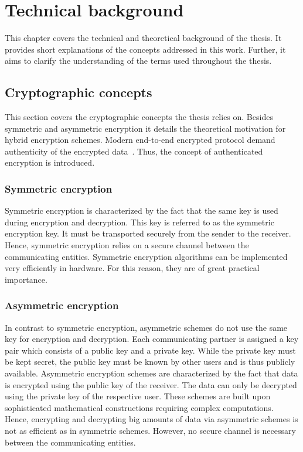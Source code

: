 \documentclass[../main.tex]{subfiles}
\begin{document}
\chapter{Technical background}
This chapter covers the technical and theoretical background of the thesis.
It provides short explanations of the concepts addressed in this work.
Further, it aims to clarify the understanding of the terms used throughout the thesis.


\section{Cryptographic concepts}
This section covers the cryptographic concepts the thesis relies on.
Besides symmetric and asymmetric encryption it details the theoretical motivation for hybrid encryption schemes.
Modern end-to-end encrypted protocol demand authenticity of the encrypted data~\cite{Mallory2022}.
Thus, the concept of authenticated encryption is introduced.

\subsection{Symmetric encryption}
Symmetric encryption is characterized by the fact that the same key is used during encryption and decryption.
This key is referred to as the symmetric encryption key.
It must be transported securely from the sender to the receiver.
Hence, symmetric encryption relies on a secure channel between the communicating entities.
Symmetric encryption algorithms can be implemented very efficiently in hardware.
For this reason, they are of great practical importance.~\cite[300]{Eckert2018}

\subsection{Asymmetric encryption}
In contrast to symmetric encryption, asymmetric schemes do not use the same key for encryption and decryption.
Each communicating partner is assigned a key pair which consists of a public key and a private key.
While the private key must be kept secret, the public key must be known by other users and is thus publicly available.
Asymmetric encryption schemes are characterized by the fact that data is encrypted using the public key of the receiver.
The data can only be decrypted using the private key of the respective user.
These schemes are built upon sophisticated mathematical constructions requiring complex computations.
Hence, encrypting and decrypting big amounts of data via asymmetric schemes is not as efficient as in symmetric schemes.
However, no secure channel is necessary between the communicating entities.~\cite[331]{Eckert2018}
\end{document}
